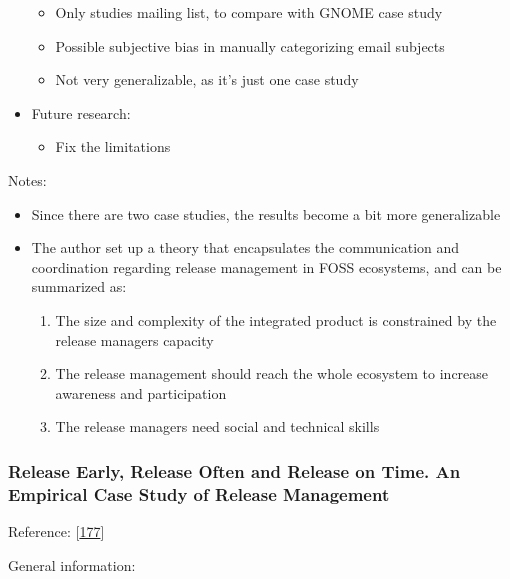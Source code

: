 \documentclass[]{book}
\providecommand{\tightlist}{%
  \setlength{\itemsep}{0pt}\setlength{\parskip}{0pt}}
\begin{document}
\begin{itemize}
  \begin{itemize}
  \tightlist
  \item
    Only studies mailing list, to compare with GNOME case study
  \item
    Possible subjective bias in manually categorizing email subjects
  \item
    Not very generalizable, as it's just one case study
  \end{itemize}
\item
  Future research:

  \begin{itemize}
  \tightlist
  \item
    Fix the limitations
  \end{itemize}
\end{itemize}

Notes:

\begin{itemize}
\tightlist
\item
  Since there are two case studies, the results become a bit more
  generalizable
\item
  The author set up a theory that encapsulates the communication and
  coordination regarding release management in FOSS ecosystems, and can
  be summarized as:

  \begin{enumerate}
  \def\labelenumi{\arabic{enumi}.}
  \tightlist
  \item
    The size and complexity of the integrated product is constrained by
    the release managers capacity
  \item
    The release management should reach the whole ecosystem to increase
    awareness and participation
  \item
    The release managers need social and technical skills
  \end{enumerate}
\end{itemize}

\subsubsection{Release Early, Release Often and Release on Time. An
Empirical Case Study of Release
Management}\label{release-early-release-often-and-release-on-time.-an-empirical-case-study-of-release-management}

Reference: {[}\protect\hyperlink{ref-teixeira2017a}{177}{]}

General information:
\end{document}
